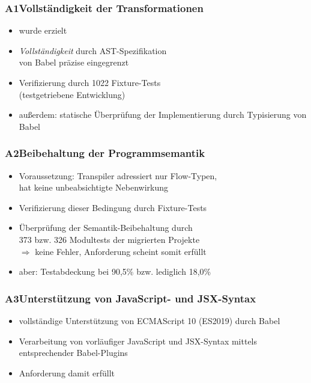       \begin{frame}
        \frametitle{A1\hspace{0.75em}Vollständigkeit der Transformationen}
        \begin{itemize}
          \item wurde erzielt
          \item \textit{Vollständigkeit} durch AST-Spezifikation~\autocite{BABEL:PARSER_SPEC}\\von Babel präzise eingegrenzt
          \item Verifizierung durch 1022 Fixture-Tests\\(testgetriebene Entwicklung)
          \item außerdem: statische Überprüfung der Implementierung durch Typisierung von Babel
        \end{itemize}
      \end{frame}

      \begin{frame}
        \frametitle{A2\hspace{0.75em}Beibehaltung der Programmsemantik}
          \begin{itemize}
            \item Voraussetzung: Transpiler adressiert nur Flow-Typen,\\hat keine unbeabsichtigte Nebenwirkung
            \item Verifizierung dieser Bedingung durch Fixture-Tests
            \item Überprüfung der Semantik-Beibehaltung durch\\373 bzw. 326 Modultests der migrierten Projekte\\
              \smallskip
              $\Rightarrow$ keine Fehler, Anforderung scheint somit erfüllt
            \item aber: Testabdeckung bei 90,5\% bzw. lediglich 18,0\%
          \end{itemize}
      \end{frame}

      \begin{frame}
        \frametitle{A3\hspace{0.75em}Unterstützung von JavaScript- und JSX-Syntax}
        \begin{itemize}
          \item vollständige Unterstützung von ECMAScript 10 (ES2019) durch Babel
          \item Verarbeitung von vorläufiger JavaScript und JSX-Syntax mittels entsprechender Babel-Plugins
          \item Anforderung damit erfüllt
        \end{itemize}
      \end{frame}

